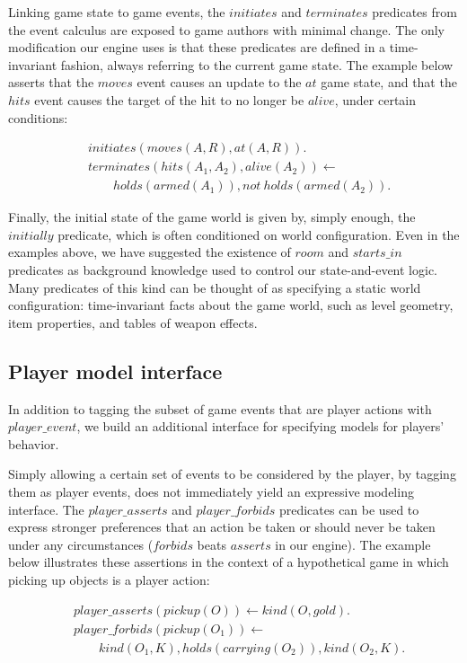 \documentclass[conference]{IEEEtran}
\newcommand{\snippet}[1]{{\vspace{-0.4cm}\begin{align*}#1\end{align*}\vspace{-0.4cm}}}
\newcommand{\logical}[1]{$#1$}
\begin{document}
Linking game state to game events, the \logical{initiates} and
\logical{terminates} predicates from the event calculus are exposed to game
authors with minimal change. The only modification our engine uses is that
these predicates are defined in a time-invariant fashion, always referring to
the current game state. The example below asserts that the \logical{moves}
event causes an update to the \logical{at} game state, and that the \logical{hits}
event causes the target of the hit to no longer be \logical{alive}, under
certain conditions:

\snippet{&initiates(moves(A,R), at(A,R)).\\
&terminates(hits(A_1,A_2), alive(A_2)) \leftarrow\\&\qquad holds(armed(A_1)), not\ holds(armed(A_2)).}

Finally, the initial state of the game world is given by, simply enough, the
\logical{initially} predicate, which is often conditioned on world
configuration. Even in the examples above, we have suggested the existence of
\logical{room} and \logical{starts\_in} predicates as background knowledge
used to control our state-and-event logic. Many predicates of this kind can be
thought of as specifying a static world configuration: time-invariant facts
about the game world, such as level geometry, item properties, and tables of
weapon effects.

\subsection{Player model interface}

In addition to tagging the subset of game events that are player actions with
\logical{player\_event}, we build an additional interface for specifying models
for players' behavior.

Simply allowing a certain set of events to be considered by the player,
by tagging them as player events, does not immediately yield an expressive
modeling interface. The \logical{player\_asserts} and \logical{player\_forbids}
predicates can be used to express stronger preferences that an action be taken
or should never be taken under any circumstances (\logical{forbids} beats
\logical{asserts} in our engine). The example below illustrates these assertions
in the context of a hypothetical game in which picking up objects is a player
action:

\snippet{&player\_asserts(pickup(O)) \leftarrow kind(O,gold).\\
&player\_forbids(pickup(O_1)) \leftarrow\\&\qquad kind(O_1,K), holds(carrying(O_2)), kind(O_2,K).}
\end{document}
